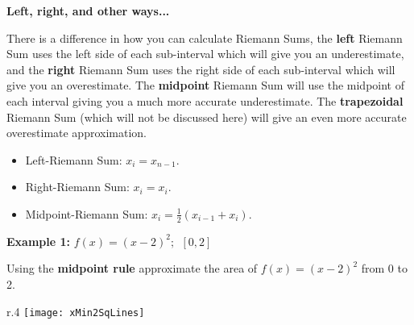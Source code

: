\documentclass[12pt]{article}
\begin{document}
\bigskip

\noindent 

\bigskip

\large \noindent \textbf{Left, right, and other ways...}

\bigskip

\normalsize There is a difference in how you can calculate Riemann Sums, the \textbf{left} Riemann Sum uses the left side of each sub-interval which will give you an underestimate, and the \textbf{right} Riemann Sum uses the right side of each sub-interval which will give you an overestimate. The \textbf{midpoint} Riemann Sum will use the midpoint of each interval giving you a much more accurate underestimate. The \textbf{trapezoidal} Riemann Sum (which will not be discussed here) will  give an even more accurate overestimate approximation.

\bigskip

\begin{itemize} 
\item \color{mypink}Left-Riemann Sum: \color{black} $\displaystyle x_i = x_{n-1}$\color{black}.
\item \color{mypink}Right-Riemann Sum: \color{black}  $\displaystyle x_i = x_i$\color{black}.
\item \color{mypink}Midpoint-Riemann Sum: \color{black} $\displaystyle x_i = \frac{1}{2}(x_{i-1} + x_i)$\color{black}.
\end{itemize}

\newpage

\noindent \color{myblue} \textbf{\large Example 1:} \color{black} $\displaystyle f(x) = (x-2)^2; \ \  [0, 2]$

\bigskip

Using the \textbf{midpoint rule} approximate the area of \color{myblue}$ f(x) = (x-2)^2 $ \color{black} from 0 to 2. 
\bigskip
\begin{wrapfigure}{r}{.4\textwidth}
\texttt{[image: xMin2SqLines]}
\end{wrapfigure}
\end{document}
